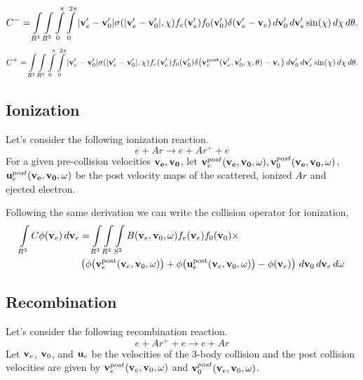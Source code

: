 \documentclass{article}
\begin{document}
\begin{align*}
C^- = \myint_{R^3} \myint_{R^3} \myint_{0}^{\pi} \myint_{0}^{2\pi} 
|\vect{v}_e^\prime-\vect{v}_0^\prime| \sigma\of{|\vect{v}_e^\prime-\vect{v}_0^\prime|, \chi}
f_e\of{\vect{v}_e^\prime} f_0\of{\vect{v}_0^\prime} 
\delta\of{\vect{v}_e^\prime - \vect{v}_e} 
\diff{\vect{v}_0^\prime} \diff{\vect{v}_e^\prime} \sin\of{\chi} \diff{\chi} \diff{\theta}.
\end{align*}
\begin{align*}
C^+ = \myint_{R^3} \myint_{R^3} \myint_{0}^{\pi} \myint_{0}^{2\pi} 
|\vect{v}_e^\prime-\vect{v}_0^\prime| \sigma\of{|\vect{v}_e^\prime-\vect{v}_0^\prime|, \chi}
f_e\of{\vect{v}_e^\prime} f_0\of{\vect{v}_0^\prime} 
\delta\of{\vect{v}_e^\text{post}\of{\vect{v}_e^\prime, \vect{v}_0^\prime, \chi, \theta} - \vect{v}_e} 
\diff{\vect{v}_0^\prime} \diff{\vect{v}_e^\prime} \sin\of{\chi} \diff{\chi} \diff{\theta}.
\end{align*}

\clearpage
\subsection{Ionization}
Let's consider the following ionization reaction. 
\begin{equation}
	e + Ar \rightarrow e + Ar^{+} + e
\end{equation}
For a given pre-collision velocities $\mathbf{v_e}, \mathbf{v_0}$, let $\mathbf{v}^{post}_e(\mathbf{v_e},\mathbf{v_0},\omega), \mathbf{v}^{post}_0(\mathbf{v_e},\mathbf{v_0},\omega)$, $\mathbf{u}^{post}_e(\mathbf{v_e},\mathbf{v_0},\omega)$ be the post velocity maps of the scattered, ionized $Ar$ and ejected electron.

Following the same derivation we can write the collision operator for ionization, 
\begin{align}
\myint_{R^3} C \phi\of{\vect{v}_e} \diff{\vect{v}_e} 
&=
\myint_{R^3} \myint_{R^3} \myint_{S^2} 
B\of{\vect{v}_e, \vect{v}_0, \vect{\omega}}
f_e\of{\vect{v}_e} f_0\of{\vect{v}_0} \times \\
&\left(
\phi\of{\vect{v}_e^\text{post}\of{\vect{v}_e, \vect{v}_0, \vect{\omega}}} +
\phi\of{\vect{u}_e^\text{post}\of{\vect{v}_e, \vect{v}_0, \vect{\omega}}} 
- \phi\of{\vect{v}_e} 
\right)
\diff{\vect{v}_0} \diff{\vect{v}_e} \diff{\vect{\omega}}
\end{align}  

\subsection{Recombination}
Let's consider the following recombination reaction. 
\begin{equation}
	e + Ar^{+} + e \rightarrow e + Ar
\end{equation}
Let $\mathbf{v}_e$, $\mathbf{v}_0$, and $\mathbf{u}_e$ be the velocities of the 3-body collision and the post collision velocities are given by $\mathbf{v}^{post}_e(\mathbf{v}_e,\mathbf{v}_0,\omega)$ and $\mathbf{v}^{post}_0(\mathbf{v}_e,\mathbf{v}_0,\omega)$.
\end{document}
